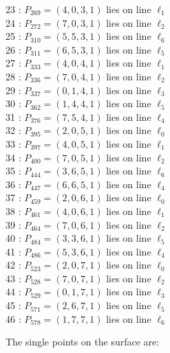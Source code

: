 \documentclass{article}
\begin{document}
{\begin{multicols}{2}
23 : $P_{269}=( 4, 0, 3, 1 )$ lies on line $\ell_{1}$\\
24 : $P_{272}=( 7, 0, 3, 1 )$ lies on line $\ell_{2}$\\
25 : $P_{310}=( 5, 5, 3, 1 )$ lies on line $\ell_{6}$\\
26 : $P_{311}=( 6, 5, 3, 1 )$ lies on line $\ell_{5}$\\
27 : $P_{333}=( 4, 0, 4, 1 )$ lies on line $\ell_{1}$\\
28 : $P_{336}=( 7, 0, 4, 1 )$ lies on line $\ell_{2}$\\
29 : $P_{337}=( 0, 1, 4, 1 )$ lies on line $\ell_{3}$\\
30 : $P_{362}=( 1, 4, 4, 1 )$ lies on line $\ell_{5}$\\
31 : $P_{376}=( 7, 5, 4, 1 )$ lies on line $\ell_{4}$\\
32 : $P_{395}=( 2, 0, 5, 1 )$ lies on line $\ell_{0}$\\
33 : $P_{397}=( 4, 0, 5, 1 )$ lies on line $\ell_{1}$\\
34 : $P_{400}=( 7, 0, 5, 1 )$ lies on line $\ell_{2}$\\
35 : $P_{444}=( 3, 6, 5, 1 )$ lies on line $\ell_{6}$\\
36 : $P_{447}=( 6, 6, 5, 1 )$ lies on line $\ell_{4}$\\
37 : $P_{459}=( 2, 0, 6, 1 )$ lies on line $\ell_{0}$\\
38 : $P_{461}=( 4, 0, 6, 1 )$ lies on line $\ell_{1}$\\
39 : $P_{464}=( 7, 0, 6, 1 )$ lies on line $\ell_{2}$\\
40 : $P_{484}=( 3, 3, 6, 1 )$ lies on line $\ell_{5}$\\
41 : $P_{486}=( 5, 3, 6, 1 )$ lies on line $\ell_{4}$\\
42 : $P_{523}=( 2, 0, 7, 1 )$ lies on line $\ell_{0}$\\
43 : $P_{528}=( 7, 0, 7, 1 )$ lies on line $\ell_{2}$\\
44 : $P_{529}=( 0, 1, 7, 1 )$ lies on line $\ell_{3}$\\
45 : $P_{571}=( 2, 6, 7, 1 )$ lies on line $\ell_{5}$\\
46 : $P_{578}=( 1, 7, 7, 1 )$ lies on line $\ell_{6}$\\
\end{multicols}
The single points on the surface are:\\
}
\end{document}

